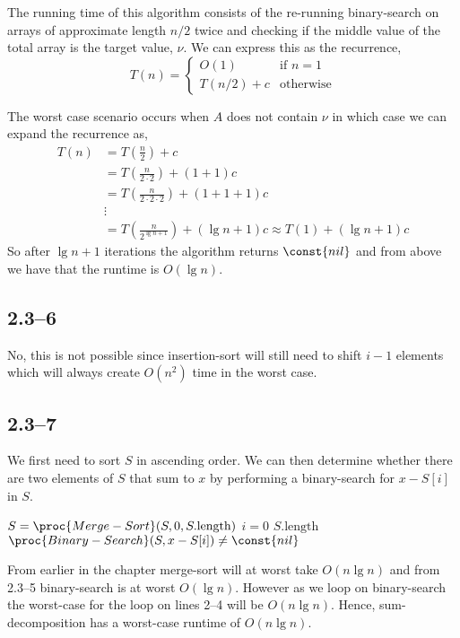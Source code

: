 The running time of this algorithm consists of the re-running binary-search on arrays of approximate length $n/2$ twice and checking if the middle value of the total array is the target value, $\nu$. We can express this as the recurrence,
\begin{equation*}
	T(n) =
	\begin{cases}
		O(1)& \text{if }n=1\\
		T(n/2) + c& \text{otherwise}
	\end{cases}
\end{equation*}

The worst case scenario occurs when $A$ does not contain $\nu$ in which case we can expand the recurrence as,
\begin{equation*}
	\begin{aligned}
		T(n) &= T\left(\frac{n}{2}\right) + c\\
		&= T\left(\frac{n}{2\cdot2}\right) + (1 + 1)c\\
		&= T\left(\frac{n}{2\cdot2\cdot2}\right) + (1 + 1 + 1)c\\
		&\vdots\\
		&= T\left(\frac{n}{2^{\lg n + 1}}\right) + (\lg n + 1)c \approx T(1) + (\lg n + 1)c
	\end{aligned}
\end{equation*}
So after $\lg n + 1$ iterations the algorithm returns $\const{nil}$ and from above we have that the runtime is $O(\lg n)$.

\subsection*{2.3--6}

No, this is not possible since insertion-sort will still need to shift $i-1$ elements which will always create $O(n^{2})$ time in the worst case.

\subsection*{2.3--7}

We first need to sort $S$ in ascending order. We can then determine whether there are two elements of $S$ that sum to $x$ by performing a binary-search for $x-S[i]$ in $S$.
\begin{codebox}
	\li $S = \proc{Merge-Sort}(S,0,S.\text{length})$
	\li \For $i=0$ \To $S.\text{length}$
	\li \Do
				\If $\proc{Binary-Search}(S,x-S[i]) \neq \const{nil}$
	\li		\Then
					\Return {}
				\End
			\End
	\li \Return {}
\end{codebox}

From earlier in the chapter merge-sort will at worst take $O(n\lg n)$ and from 2.3--5 binary-search is at worst $O(\lg n)$. However as we loop on binary-search the worst-case for the loop on lines 2--4 will be $O(n\lg n)$. Hence, sum-decomposition has a worst-case runtime of $O(n\lg n)$.
